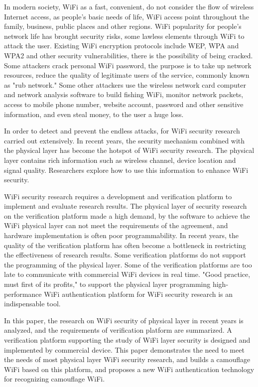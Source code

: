 \begin{eabstract}

	In modern society, WiFi as a fast, convenient, do not consider the flow of wireless Internet access, as people's basic needs of life, WiFi access point throughout the family, business, public places and other regions.
	WiFi popularity for people's network life has brought security risks, some lawless elements through WiFi to attack the user.
	Existing WiFi encryption protocols include WEP, WPA and WPA2 and other security vulnerabilities, there is the possibility of being cracked.
	Some attackers crack personal WiFi password, the purpose is to take up network resources, reduce the quality of legitimate users of the service, commonly known as "rub network."
	Some other attackers use the wireless network card computer and network analysis software to build fishing WiFi, monitor network packets, access to mobile phone number, website account, password and other sensitive information, and even steal money, to the user a huge loss.

	In order to detect and prevent the endless attacks, for WiFi security research carried out extensively.
	In recent years, the security mechanism combined with the physical layer has become the hotspot of WiFi security research. The physical layer contains rich information such as wireless channel, device location and signal quality. Researchers explore how to use this information to enhance WiFi security.

	WiFi security research requires a development and verification platform to implement and evaluate research results.
	The physical layer of security research on the verification platform made a high demand, by the software to achieve the WiFi physical layer can not meet the requirements of the agreement, and hardware implementation is often poor programmability.
	In recent years, the quality of the verification platform has often become a bottleneck in restricting the effectiveness of research results. Some verification platforms do not support the programming of the physical layer. Some of the verification platforms are too late to communicate with commercial WiFi devices in real time.
	"Good practice, must first of its profits," to support the physical layer programming high-performance WiFi authentication platform for WiFi security research is an indispensable tool.

	In this paper, the research on WiFi security of physical layer in recent years is analyzed, and the requirements of verification platform are summarized. A verification platform supporting the study of WiFi layer security is designed and implemented by commercial device. This paper demonstrates the need to meet the needs of most physical layer WiFi security research, and builds a camouflage WiFi based on this platform, and proposes a new WiFi authentication technology for recognizing camouflage WiFi.

\end{eabstract}
